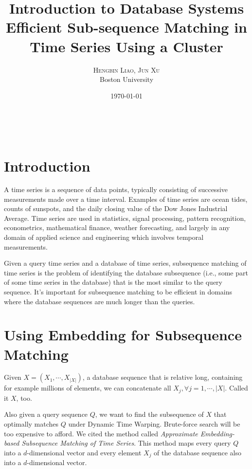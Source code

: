 \documentclass{article}
\title{\textbf{Introduction to Database Systems} \\
	Efficient Sub-sequence Matching in Time Series Using a Cluster}
\author{\textsc{Hengbin Liao, Jun Xu}
	\\{Boston University}}
\date{\today}
\makeatletter
\renewcommand{\maketitle}{
	\begin{flushright}
		{\LARGE\@title}

		\vspace{50pt}

		{\large\@author}
		\\\@date

		\vspace{30pt}
	\end{flushright}
}
\makeatother
\begin{document}
\maketitle

\section{Introduction}
A time series is a sequence of data points, typically consisting of successive measurements made over a time interval. Examples of time series are ocean tides, counts of sunspots, and the daily closing value of the Dow Jones Industrial Average. Time series are used in statistics, signal processing, pattern recognition, econometrics, mathematical finance, weather forecasting, and largely in any domain of applied science and engineering which involves temporal measurements. \par

Given a query time series and a database of time series, subsequence matching of time series is the problem of identifying the database subsequence (i.e., some part of some time series in the database) that is the most similar to the query sequence. It's important for subsequence matching to be efficient in domains where the database sequences are much longer than the queries.

\section{Using Embedding for Subsequence Matching}
Given $X = (X_1, \cdots, X_{|X|})$, a database sequence that is relative long, containing for example millions of elements, we can concatenate all $X_j, \forall j = 1, \cdots, |X|$. Called it $X$, too. \par

Also given a query sequence $Q$, we want to find the subsequence of $X$ that optimally matches $Q$ under Dynamic Time Warping. Brute-force search will be too expensive to afford. We cited the method called \emph{Approximate Embedding-based Subsequence Matching of Time Series}. This method maps every query $Q$ into a $d$-dimensional vector and every element $X_j$ of the database sequence also into a $d$-dimensional vector. \par
\end{document}

